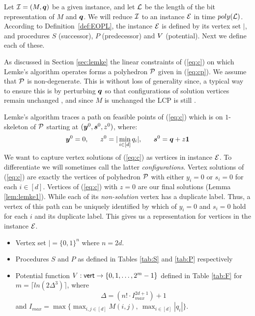 Let $\mbox{${\mathcal I}$}=(M,\mbox{\boldmath $q$})$ be a given \PLCP instance, and let $\mbox{${\mathcal L}$}$ be the length of the 
bit representation of $M$ and $\mbox{\boldmath $q$}$. 
We will reduce $\mbox{${\mathcal I}$}$ to an \EOPL instance $\mbox{${\mathcal E}$}$ in time $poly(\mbox{${\mathcal L}$})$. 
According to Definition~\ref{def:EOPL}, the instance $\mbox{${\mathcal E}$}$ is defined 
by its vertex set $\vert$, and procedures $S$ (successor), $P$ (predecessor) and $\mbox{$V$}$ (potential). 
Next we define each of these. 

As discussed in Section \ref{sec:lemke} the linear constraints of (\ref{eq:c})
on which Lemke's algorithm operates forms a polyhedron $\mbox{${\mathcal P}$}$ given in
(\ref{eq:cp}). We assume that $\mbox{${\mathcal P}$}$ is non-degenerate. This is without
loss of generality since, a typical way to ensure this is by perturbing $\mbox{\boldmath $q$}$ so
that configurations of solution vertices remain unchanged
\cite{cottle2009linear}, and since $M$ is unchanged the LCP is still \PLCP. 

Lemke's algorithm traces a path on feasible points of (\ref{eq:c}) which is on
$1$-skeleton of $\mbox{${\mathcal P}$}$ starting at $(\mbox{\boldmath $y$}^0,\mbox{\boldmath $s$}^0,z^0)$, where:
\begin{equation}\label{eq:v0}
\yy^0=0,\ \ \ \ \ z^0= |\min_{i \in [d]} q_i|,\ \ \ \ \  \ps^0=\qq+z\ones
\end{equation}
We want to capture
vertex solutions of (\ref{eq:c}) as vertices in \EOPL instance $\mbox{${\mathcal E}$}$. To
differentiate we will sometimes call the latter {\em configurations}. Vertex
solutions of (\ref{eq:c}) are exactly the vertices of polyhedron $\mbox{${\mathcal P}$}$ with
either $y_i=0$ or $s_i=0$ for each $i\in [d]$. Vertices of (\ref{eq:c}) with
$z=0$ are our final solutions (Lemma \ref{lem:lemke1}). While each of its {\em
non-solution} vertex has a duplicate label. Thus, a vertex of this path can be
uniquely identified by which of $y_i=0$ and $s_i=0$ hold for each $i$ and its
duplicate label. This gives us a representation for vertices in the \EOPL
instance $\mbox{${\mathcal E}$}$. 

\medskip


\begin{itemize}
\item Vertex set $\vert=\{0,1\}^n$ where $n = 2d$. 
\item Procedures $S$ and $P$ as defined in Tables \ref{tab:S} and \ref{tab:P} respectively
\item Potential function $\mbox{$V$}:\operatorname{\mathsf{vert}} \rightarrow \{0,1,\dots, 2^m-1\}$ defined in Table \ref{tab:F} for $m=\lceil ln(2\Delta^3)\rceil$, 
	  where $$\Delta=(n! \cdot I_{max}^{2d+1})+1$$ 
	  and $I_{max} = \max\{\max_{i,j\in [d]} M(i,j),\ \max_{i\in [d]} |q_i|\}$. 
\end{itemize}

